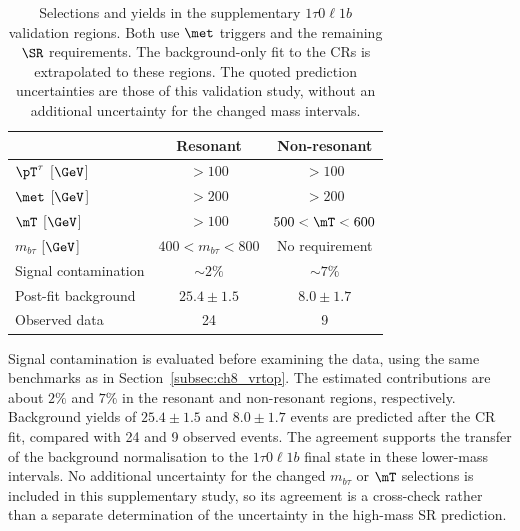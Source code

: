 \begin{table}[htbp]
    \centering
    \small
    \caption{Selections and yields in the supplementary $1\tau0\ell1b$ validation regions. Both use $\met$ triggers and the remaining $\SR$ requirements. The background-only fit to the CRs is extrapolated to these regions. The quoted prediction uncertainties are those of this validation study, without an additional uncertainty for the changed mass intervals.}
    \label{tab:ch8_tau1b_vr}
    \begin{tabular}{lcc}
        \toprule
         & Resonant & Non-resonant \\
        \midrule
        $\pT^\tau$ [$\GeV$] & $>100$ & $>100$ \\
        $\met$ [$\GeV$] & $>200$ & $>200$ \\
        $\mT$ [$\GeV$] & $>100$ & $500<\mT<600$ \\
        $m_{b\tau}$ [$\GeV$] & $400<m_{b\tau}<800$ & No requirement \\
        \midrule
        Signal contamination & $\sim2\%$ & $\sim7\%$ \\
        Post-fit background & $25.4\pm1.5$ & $8.0\pm1.7$ \\
        Observed data & 24 & 9 \\
        \bottomrule
    \end{tabular}
\end{table}

Signal contamination is evaluated before examining the data, using the same benchmarks as in Section~\ref{subsec:ch8_vrtop}.
The estimated contributions are about $2\%$ and $7\%$ in the resonant and non-resonant regions, respectively.
Background yields of $25.4\pm1.5$ and $8.0\pm1.7$ events are predicted after the CR fit, compared with 24 and 9 observed events.
The agreement supports the transfer of the background normalisation to the $1\tau0\ell1b$ final state in these lower-mass intervals.
No additional uncertainty for the changed $m_{b\tau}$ or $\mT$ selections is included in this supplementary study, so its agreement is a cross-check rather than a separate determination of the uncertainty in the high-mass SR prediction.
